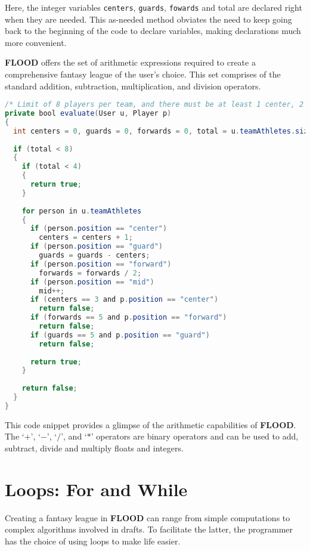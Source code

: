 \documentclass[12pt]{report}
\begin{document}
Here, the integer variables \texttt{centers}, \texttt{guards}, \texttt{fowards} and total are declared right when they are needed. This as-needed method obviates the need to keep going back to the beginning of the code to declare variables, making declarations much more convenient.

\textbf{FLOOD} offers the set of arithmetic expressions required to create a comprehensive fantasy league of the user's choice. This set comprises of the standard addition, subtraction, multiplication, and division operators.

\begin{singlespace}
\begin{lstlisting}[language=Java,label=some-code,caption=Arithmetic expressions]
/* Limit of 8 players per team, and there must be at least 1 center, 2 guards and 2 forwards per team. */
private bool evaluate(User u, Player p)
{
  int centers = 0, guards = 0, forwards = 0, total = u.teamAthletes.size();
  
  if (total < 8)
  {
    if (total < 4)
    {
      return true;
    }
    
    for person in u.teamAthletes
    {
      if (person.position == "center")
        centers = centers + 1;
      if (person.position == "guard")
        guards = guards - centers;
      if (person.position == "forward")
        forwards = forwards / 2;
      if (person.position == "mid")
        mid++;
      if (centers == 3 and p.position == "center")
        return false;
      if (forwards == 5 and p.position == "forward")
        return false;
      if (guards == 5 and p.position == "guard")
        return false;
    
      return true;
    }
  
    return false;
  }
}
\end{lstlisting}
\end{singlespace}

This code snippet provides a glimpse of the arithmetic capabilities of \textbf{FLOOD}. The `$+$', `$-$', `$/$', and `$*$' operators are binary operators and can be used to add, subtract, divide and multiply floats and integers.

\section{Loops: For and While}

Creating a fantasy league in \textbf{FLOOD} can range from simple computations to complex algorithms involved in drafts. To facilitate the latter, the programmer has the choice of using loops to make life easier.
\end{document}
